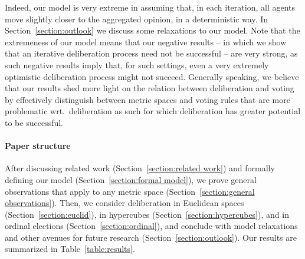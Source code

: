 \documentclass[runningheads,envcountsame]{llncs}
\begin{document}
Indeed, our model is very extreme in assuming that, in each iteration, all agents move slightly closer to the aggregated opinion, in a deterministic way. In Section~\ref{section:outlook} we discuss some relaxations to our model.
%
Note that the extremeness of our model means that our negative results -- in which we show that an iterative deliberation process need not be successful -- are very strong, as such negative results imply that, for such settings, even a very extremely optimistic deliberation process might not succeed.
%
Generally speaking, we believe that our results shed more light on the relation between deliberation and voting by effectively distinguish between metric spaces and voting rules that are more problematic wrt.\ deliberation as such for which deliberation has greater potential to be successful.


\paragraph{Paper structure}
%
After discussing related work (Section~\ref{section:related work}) and formally defining our model (Section~\ref{section:formal model}), we prove general observations that apply to any metric space (Section~\ref{section:general observations}).
%
Then, we consider deliberation in Euclidean spaces (Section~\ref{section:euclid}), in hypercubes (Section~\ref{section:hypercubes}), and in ordinal elections (Section~\ref{section:ordinal}), and conclude with model relaxations and other avenues for future research (Section~\ref{section:outlook}).
%
Our results are summarized in Table~\ref{table:results}.
\end{document}
